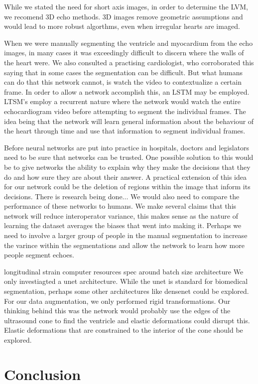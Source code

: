 \documentclass[12pt]{article}
\begin{document}
While we stated the need for short axis images, in order to determine the LVM, we recomend 3D echo methods.
3D images remove geometric assumptions and would lead to more robust algorthms, even when irregular hearts are imaged.

When we were manually segmenting the ventricle and myocardium from the echo images, in many cases it was exceedingly difficult to discern where the walls of the heart were.
We also consulted a practising cardiologist, who corroborated this saying that in some cases the segmentation can be difficult.
But what humans  can do that this network cannot, is watch the video to contextualize a certain frame.
In order to allow a network accomplish this, an LSTM may be employed.
LTSM's employ a recurrent nature where the network would watch the entire echocardiogram video before attempting to segment the individual frames.
The idea being that the network will learn general information about the behaviour of the heart through time and use that information to segment individual frames.

Before neural networks are put into practice in hospitals, doctors and legislators need to be sure that networks can be trusted.
One possible solution to this would be to give networks the ability to explain why they make the decisions that they do and how sure they are about their answer.
A practical extension of this idea for our network could be the deletion of regions within the image that inform its decisions.
There is research being done...
We would also need to compare the performance of these networks to humans.
We make several claims that this network will reduce interoperator variance, this makes sense as the nature of learning the dataset averages the biases that went into making it.
Perhaps we need to involve a larger group of people in the manual segmentation to increase the varince within the segmentations and allow the network to learn how more people segment echoes.


longitudinal strain
computer resources
spec around batch size
architecture
We only investiagted a unet architecture.
While the unet is standard for biomedical segmentation, perhaps some other architectures like densenet\cite{densenet} could be explored.
For our data augmentation, we only performed rigid transformations.
Our thinking behind this was the network would probably use the edges of the ultrasound cone to find the ventricle and elastic deformations could disrupt this.
Elastic deformations that are constrained to the interior of the cone should be explored.
\section{Conclusion}



%
\end{document}
